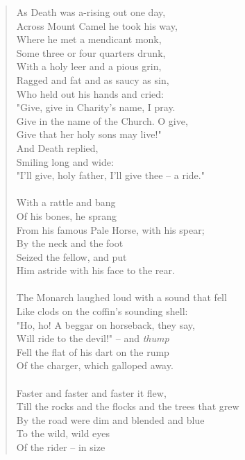 \documentclass[11pt]{article}
\begin{document}
\begin{quote}   As Death was a-rising out one day, \\
  Across Mount Camel he took his way, \\
      Where he met a mendicant monk, \\
      Some three or four quarters drunk, \\
  With a holy leer and a pious grin, \\
  Ragged and fat and as saucy as sin, \\
      Who held out his hands and cried: \\
  "Give, give in Charity's name, I pray. \\
  Give in the name of the Church.  O give, \\
  Give that her holy sons may live!" \\
      And Death replied, \\
      Smiling long and wide: \\
      "I'll give, holy father, I'll give thee -- a ride." \\
 \\
      With a rattle and bang \\
      Of his bones, he sprang \\
  From his famous Pale Horse, with his spear; \\
      By the neck and the foot \\
      Seized the fellow, and put \\
  Him astride with his face to the rear. \\
 \\
  The Monarch laughed loud with a sound that fell \\
  Like clods on the coffin's sounding shell: \\
  "Ho, ho!  A beggar on horseback, they say, \\
      Will ride to the devil!" -- and {\em thump} \\
      Fell the flat of his dart on the rump \\
  Of the charger, which galloped away. \\
 \\
  Faster and faster and faster it flew, \\
  Till the rocks and the flocks and the trees that grew \\
  By the road were dim and blended and blue \\
      To the wild, wild eyes \\
      Of the rider -- in size \\

\end{quote}
\end{document}
